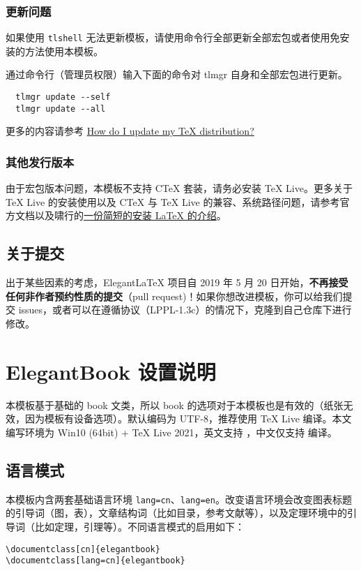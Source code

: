 \documentclass[cn,10pt,math=newtx,citestyle=gb7714-2015,bibstyle=gb7714-2015]{elegantbook}
\begin{document}
\subsection{更新问题}

如果使用 \lstinline{tlshell} 无法更新模板，请使用命令行全部更新全部宏包或者使用免安装的方法使用本模板。

通过命令行（管理员权限）输入下面的命令对 tlmgr 自身和全部宏包进行更新。

\begin{lstlisting}
  tlmgr update --self 
  tlmgr update --all
\end{lstlisting}

更多的内容请参考 \href{https://tex.stackexchange.com/questions/55437/how-do-i-update-my-tex-distribution}{How do I update my \TeX{} distribution?}

\subsection{其他发行版本}

由于宏包版本问题，本模板不支持 C\TeX{} 套装，请务必安装 TeX Live。更多关于 \TeX{} Live 的安装使用以及 C\TeX{} 与 \TeX{} Live 的兼容、系统路径问题，请参考官方文档以及啸行的\href{https://github.com/OsbertWang/install_latex/releases}{一份简短的安装 \LaTeX{} 的介绍}。


\section{关于提交}

出于某些因素的考虑，Elegant\LaTeX{} 项目自 2019 年 5 月 20 日开始，\textbf{不再接受任何非作者预约性质的提交}（pull request)！如果你想改进模板，你可以给我们提交 issues，或者可以在遵循协议（LPPL-1.3c）的情况下，克隆到自己仓库下进行修改。


\chapter{ElegantBook 设置说明}

本模板基于基础的 book 文类，所以 book 的选项对于本模板也是有效的（纸张无效，因为模板有设备选项）。默认编码为 UTF-8，推荐使用 \TeX{} Live 编译。本文编写环境为 Win10 (64bit) + \TeX{} Live 2021，英文支持 ，中文仅支持  编译。

\section{语言模式}
本模板内含两套基础语言环境 \lstinline{lang=cn}、\lstinline{lang=en}。改变语言环境会改变图表标题的引导词（图，表），文章结构词（比如目录，参考文献等），以及定理环境中的引导词（比如定理，引理等）。不同语言模式的启用如下：
\begin{lstlisting}
\documentclass[cn]{elegantbook} 
\documentclass[lang=cn]{elegantbook}
\end{lstlisting}
\end{document}
